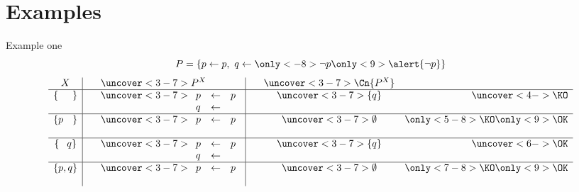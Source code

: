 \section{Examples}
\begin{frame}{Example one}
\[
P
=
\left\{
    p \leftarrow p, \
    q \leftarrow \only<-8>{\neg p}\only<9>{\alert{\neg p}}
\right\}
\]
\pause
\newcommand{\PIip}{%
    \begin{array}[t]{lll}
      p &\leftarrow&p
      \\
       &&
    \end{array}}
\newcommand{\PIop}{%
    \begin{array}[t]{lll}
      p &\leftarrow&p
      \\
      q &\leftarrow&
    \end{array}}
\[
\begin{array}{c|cl|ccr}
       X                   &\ &\uncover<3-7>{P^X}&\ &\uncover<3-7>{\Cn{P^X}}&                              \\\hline
\{\phantom{p         ,q}\} &  &\uncover<3-7>{\PIop}&  &\uncover<3-7>{\{q\}}     &\uncover<4->{\KO}             \\\hline
\{         p\phantom{,q}\} &  &\uncover<3-7>{\PIip}&  &\uncover<3-7>{\emptyset} &  \only<5-8>{\KO}\only<9>{\OK}\\\hline
\{\phantom{p,}        q \} &  &\uncover<3-7>{\PIop}&  &\uncover<3-7>{\{q\}}     &\uncover<6->{\OK}             \\\hline
\{         p         ,q \} &  &\uncover<3-7>{\PIip}&  &\uncover<3-7>{\emptyset} &  \only<7-8>{\KO}\only<9>{\OK}
\end{array}
\]

\end{frame}
